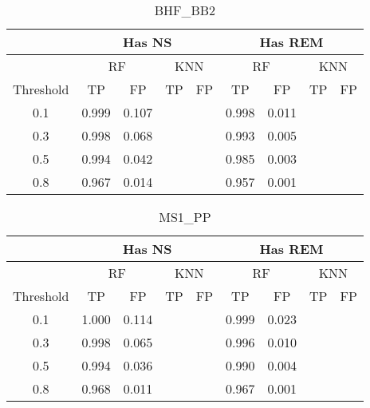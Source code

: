 \begin{table}[]
\centering
\begin{tabular}{@{}c|cccc|cccc@{}}
\toprule
\multicolumn{1}{l|}{}          & \multicolumn{4}{c|}{Has NS}                       & \multicolumn{4}{c}{Has REM}                      \\ \midrule
                               & \multicolumn{2}{c}{RF} & \multicolumn{2}{c|}{KNN} & \multicolumn{2}{c}{RF} & \multicolumn{2}{c}{KNN} \\
\multicolumn{1}{l|}{Threshold} & TP         & FP        & TP          & FP         & TP         & FP        & TP         & FP         \\ \midrule
0.1                            & 0.999      & 0.107     &             &            & 0.998      & 0.011     &            &            \\
0.3                            & 0.998      & 0.068     &             &            & 0.993      & 0.005     &            &            \\
0.5                            & 0.994      & 0.042     &             &            & 0.985      & 0.003     &            &            \\
0.8                            & 0.967      & 0.014     &             &            & 0.957      & 0.001     &            &            \\ \bottomrule
\end{tabular}
\caption{BHF\_BB2}
\label{tab:my-table}
\end{table}


\begin{table}[]
\centering
\begin{tabular}{@{}c|cccc|cccc@{}}
\toprule
\multicolumn{1}{l|}{}          & \multicolumn{4}{c|}{Has NS}                       & \multicolumn{4}{c}{Has REM}                      \\ \midrule
                               & \multicolumn{2}{c}{RF} & \multicolumn{2}{c|}{KNN} & \multicolumn{2}{c}{RF} & \multicolumn{2}{c}{KNN} \\
\multicolumn{1}{l|}{Threshold} & TP         & FP        & TP          & FP         & TP         & FP        & TP         & FP         \\ \midrule
0.1                            & 1.000      & 0.114     &             &            & 0.999      & 0.023     &            &            \\
0.3                            & 0.998      & 0.065     &             &            & 0.996      & 0.010     &            &            \\
0.5                            & 0.994      & 0.036     &             &            & 0.990      & 0.004     &            &            \\
0.8                            & 0.968      & 0.011     &             &            & 0.967      & 0.001     &            &            \\ \bottomrule
\end{tabular}
\caption{MS1\_PP}
\label{tab:my-table}
\end{table}

